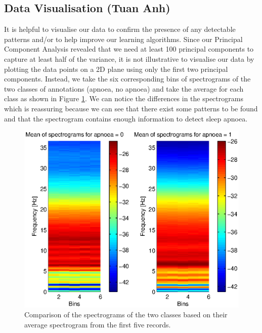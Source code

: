 \subsection{Data Visualisation (Tuan Anh)}
\label{sec:dataVisualisation-ta}
	It is helpful to visualise our data to confirm the presence of any detectable patterns and/or to help improve our learning algorithms. Since our Principal Component Analysis revealed that we need at least 100 principal components to capture at least half of the variance, it is not illustrative to visualise our data by plotting the data points on a 2D plane using only the first two principal components. Instead, we take the six corresponding bins of spectrograms of the two classes of annotations (apnoea, no apnoea) and take the average for each class as shown in Figure \ref{fig:spectrogramClassesVisualise}. We can notice the differences in the spectrograms which is reassuring because we can see that there exist some patterns to be found and that the spectrogram contains enough information to detect sleep apnoea.
	\begin{figure}[ht!]
		\centering
			\includegraphics{drawings/spectrogramClassesVisualise.eps}
		\caption{Comparison of the spectrograms of the two classes based on their average spectrogram from the first five records.}
		\label{fig:spectrogramClassesVisualise}
	\end{figure}